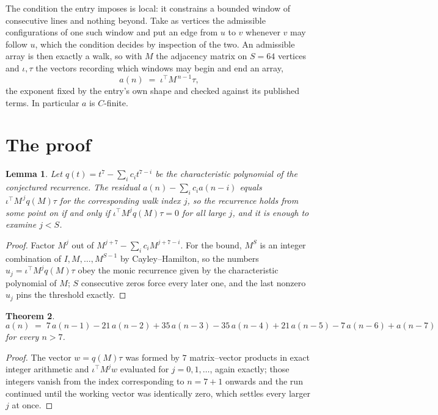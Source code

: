 \documentclass[11pt,a4paper]{article}
\theoremstyle{plain}
\newtheorem{theorem}{Theorem}
\newtheorem{lemma}[theorem]{Lemma}
\theoremstyle{definition}
\begin{document}
The condition the entry imposes is local: it constrains a bounded window of consecutive lines and nothing beyond. Take as
vertices the admissible configurations of one such window and put an edge from $u$ to $v$
whenever $v$ may follow $u$, which the condition decides by inspection of the two. An
admissible array is then exactly a walk, so with $M$ the adjacency matrix on $S=64$ vertices
and $\iota,\tau$ the vectors recording which windows may begin and end an array,
\[
a(n)\;=\;\iota^{\!\top}M^{\,n-1}\tau ,
\]
the exponent fixed by the entry's own shape and checked against its published terms. In
particular $a$ is $C$-finite.

\section{The proof}

\begin{lemma}\label{lem:crit}
Let $q(t)=t^{7}-\sum_i c_it^{7-i}$ be the characteristic polynomial of the
conjectured recurrence. The residual $a(n)-\sum_ic_ia(n-i)$ equals
$\iota^{\!\top}M^{\,j}q(M)\tau$ for the corresponding walk index $j$, so the recurrence
holds from some point on if and only if $\iota^{\!\top}M^{j}q(M)\tau=0$ for all large $j$,
and it is enough to examine $j<S$.
\end{lemma}

\begin{proof}
Factor $M^{j}$ out of $M^{j+7}-\sum_ic_iM^{j+7-i}$. For the bound, $M^{S}$
is an integer combination of $I,M,\dots,M^{S-1}$ by Cayley--Hamilton, so the numbers
$u_j=\iota^{\!\top}M^{j}q(M)\tau$ obey the monic recurrence given by the characteristic
polynomial of $M$; $S$ consecutive zeros force every later one, and the last nonzero $u_j$
pins the threshold exactly.
\end{proof}

\begin{theorem}
\[
a(n)\;=\;7\,a(n-1) - 21\,a(n-2) + 35\,a(n-3) - 35\,a(n-4) + 21\,a(n-5) - 7\,a(n-6) + a(n-7)
\]
for every $n>7$.
\end{theorem}

\begin{proof}
The vector $w=q(M)\tau$ was formed by $7$ matrix--vector products in exact integer
arithmetic and $\iota^{\!\top}M^{j}w$ evaluated for $j=0,1,\dots$, again exactly; those
integers vanish from the index corresponding to $n=7+1$ onwards and the run continued
until the working vector was identically zero, which settles every larger $j$ at once.
\end{proof}
\end{document}
